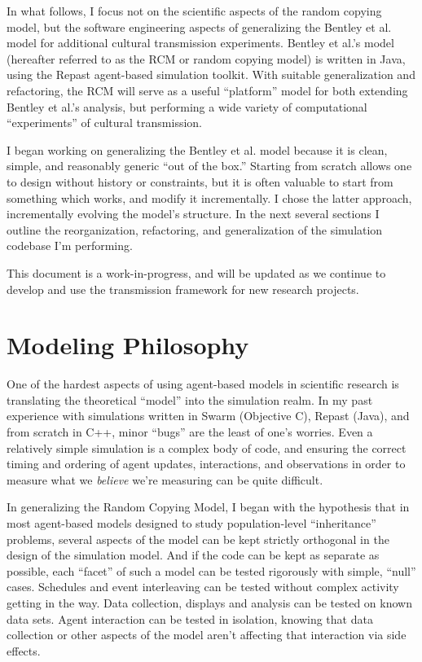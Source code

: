 \documentclass{kluwer-mem-copyright}
\begin{document}
\begin{article}
In what follows, I focus not on the scientific aspects of the random copying model, but the software engineering
aspects of generalizing the Bentley et al. model for additional cultural transmission experiments.  Bentley et al.'s model (hereafter referred to as the RCM or random copying model) is written in Java, using the Repast agent-based simulation toolkit.  With suitable generalization and refactoring, the RCM will serve as a useful ``platform'' model
for both extending Bentley et al.'s analysis, but performing a wide variety of computational ``experiments'' of cultural transmission.  

I began working on generalizing the Bentley et al. model because it is clean,
simple, and reasonably generic ``out of the box.''  Starting from scratch allows
one to design without history or constraints, but it is often valuable to start
from something which works, and modify it incrementally.  I chose the latter
approach, incrementally evolving the model's structure.  
In the next several sections I outline the reorganization, refactoring, and
generalization of the simulation codebase I'm performing.  

This document is a work-in-progress, and will be updated as we continue to
develop and use the transmission framework for new research projects.
\section{Modeling Philosophy}
One of the hardest aspects of using agent-based models in scientific research is
translating the theoretical ``model'' into the simulation realm.  In my past experience with simulations
written in Swarm (Objective C), Repast (Java), and from scratch in C++, minor
``bugs'' are the least of one's worries.  Even a relatively simple simulation is a complex body
of code, and ensuring the correct timing and ordering of agent updates,
interactions, and observations in order to measure what we \emph{believe} we're
measuring can be quite difficult.  

In generalizing the Random Copying Model, I began with the hypothesis that 
in most agent-based models designed to study
population-level ``inheritance'' problems, several aspects of the model can be
kept strictly orthogonal in the design of the simulation model.  And if the code
can be kept as separate as possible, each ``facet'' of such a model can be
tested rigorously with simple, ``null'' cases.  Schedules and event interleaving
can be tested without complex activity getting in the way.  Data collection,
displays and analysis can be tested on known data sets.  Agent interaction can
be tested in isolation, knowing that data collection or other aspects of the
model aren't affecting that interaction via side effects.  


\end{article}
\end{document}

